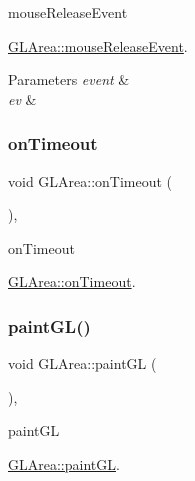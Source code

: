 mouse\+Release\+Event 

\hyperlink{classGLArea_a858693d86fe1e40a8a333466b93e0cdd}{G\+L\+Area\+::mouse\+Release\+Event}.


\begin{DoxyParams}{Parameters}
{\em event} & \\
\hline
{\em ev} & \\
\hline
\end{DoxyParams}
\mbox{\label{classGLArea_a62ff54b320abd318088f06bf861d8024}} 
\subsubsection{\texorpdfstring{on\+Timeout}{onTimeout}}
{\footnotesize\ttfamily void G\+L\+Area\+::on\+Timeout (\begin{DoxyParamCaption}{ }\end{DoxyParamCaption})\hspace{0.3cm}{\ttfamily [protected]}, {\ttfamily [slot]}}



on\+Timeout 

\hyperlink{classGLArea_a62ff54b320abd318088f06bf861d8024}{G\+L\+Area\+::on\+Timeout}. \mbox{\label{classGLArea_a235d7e6e2dcdb4c47cf368f11686ab8f}} 
\subsubsection{\texorpdfstring{paint\+G\+L()}{paintGL()}}
{\footnotesize\ttfamily void G\+L\+Area\+::paint\+GL (\begin{DoxyParamCaption}{ }\end{DoxyParamCaption})\hspace{0.3cm}{\ttfamily [override]}, {\ttfamily [protected]}}



paint\+GL 

\hyperlink{classGLArea_a235d7e6e2dcdb4c47cf368f11686ab8f}{G\+L\+Area\+::paint\+GL}. \mbox{\label{classGLArea_a9a09b4b0282edd1ab833ae7b676260de}} 
